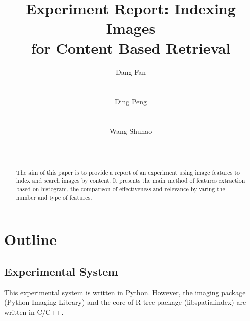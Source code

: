 \documentclass{acm_proc_article-sp}
\begin{document}
\title{Experiment Report: Indexing Images\\
for Content Based Retrieval}

\author{
\alignauthor
Dang Fan\\
       \\
       \\
\alignauthor
Ding Peng\\
       \\
       \\
\alignauthor
Wang Shuhao\\
       \\
       \\
}

\maketitle
\begin{abstract}
The aim of this paper is to provide a report of an experiment using image features to index and search images by content. It presents the main method of features extraction based on histogram, the comparison of effectiveness and relevance by varing the number and type of features.
\end{abstract}




\section{Outline}
\subsection{Experimental System}
This experimental system is written in Python. However, the imaging package (Python Imaging Library) and the core of R-tree package (libspatialindex) are written in C/C++.
\end{document}
